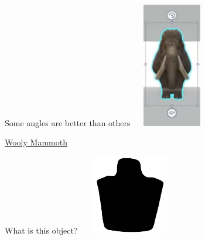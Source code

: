 \documentclass[aspectratio=169,14pt,usenames,dvipsnames]{beamer}
\begin{document}
\begin{frame}{Some angles are better than others}
\centering
\includegraphics[width=3.5cm , height=5.5cm]{Images/AIML_FD_IMG10.png} 

\tiny
\href{https://cdn.exec.talentsprint.com/content/Mammoth 3D_without audio_cropped.mp4}{Wooly Mammoth}
\end{frame}

\begin{frame}{What is this object?}
\centering
\includegraphics[width=4.5cm , height=3.5cm]{Images/IMG11.png}
\end{frame}
\end{document}
